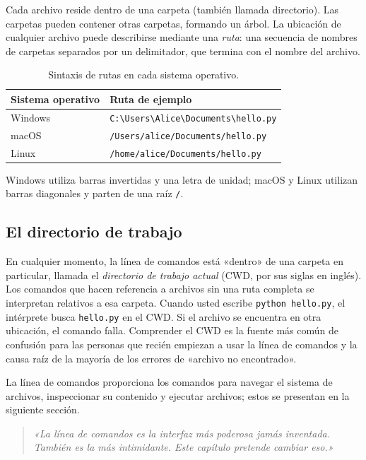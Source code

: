 Cada archivo reside dentro de una carpeta (también llamada directorio). Las
carpetas pueden contener otras carpetas, formando un árbol. La ubicación de
cualquier archivo puede describirse mediante una \emph{ruta}: una secuencia
de nombres de carpetas separados por un delimitador, que termina con el
nombre del archivo.

\begin{table}[htbp]
\centering
\caption{Sintaxis de rutas en cada sistema operativo.}
\label{tab:path-syntax}
\begin{tabular}{p{3.5cm} p{9cm}}
\toprule
\textbf{Sistema operativo} & \textbf{Ruta de ejemplo} \\
\midrule
Windows & \texttt{C:\textbackslash Users\textbackslash Alice\textbackslash Documents\textbackslash hello.py} \\
macOS   & \texttt{/Users/alice/Documents/hello.py} \\
Linux   & \texttt{/home/alice/Documents/hello.py} \\
\bottomrule
\end{tabular}
\end{table}

Windows utiliza barras invertidas y una letra de unidad; macOS y Linux
utilizan barras diagonales y parten de una raíz \texttt{/}.

\subsection{El directorio de trabajo}

En cualquier momento, la línea de comandos está «dentro» de una carpeta en
particular, llamada el \emph{directorio de trabajo actual} (CWD, por sus
siglas en inglés). Los comandos que hacen referencia a archivos sin una ruta
completa se interpretan relativos a esa carpeta. Cuando usted escribe
\texttt{python hello.py}, el intérprete busca \texttt{hello.py} en el CWD. Si
el archivo se encuentra en otra ubicación, el comando falla. Comprender el
CWD es la fuente más común de confusión para las personas que recién empiezan
a usar la línea de comandos y la causa raíz de la mayoría de los errores de
«archivo no encontrado».

La línea de comandos proporciona los comandos para navegar el sistema de
archivos, inspeccionar su contenido y ejecutar archivos; estos se presentan
en la siguiente sección.


\begin{quote}
\textit{«La línea de comandos es la interfaz más poderosa jamás inventada.
También es la más intimidante. Este capítulo pretende cambiar eso.»}
\end{quote}

